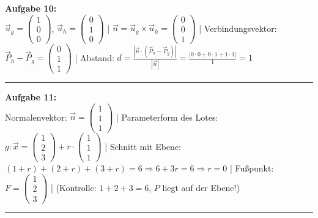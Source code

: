 \documentclass[12pt,a4paper]{article}
\newcommand{\vek}[1]{\vec{#1}}
\begin{document}
\textbf{Aufgabe 10:} \\
$\vek{u}_g = \begin{pmatrix}1\\0\\0\end{pmatrix}$, $\vek{u}_h = \begin{pmatrix}0\\1\\0\end{pmatrix}$ |
$\vek{n} = \vek{u}_g \times \vek{u}_h = \begin{pmatrix}0\\0\\1\end{pmatrix}$ |
Verbindungsvektor: $\vek{P}_h - \vek{P}_g = \begin{pmatrix}0\\1\\1\end{pmatrix}$ |
Abstand: $d = \frac{|\vek{n} \cdot (\vek{P}_h - \vek{P}_g)|}{|\vek{n}|} = \frac{|0\cdot0+0\cdot1+1\cdot1|}{1} = 1$
\begin{center}\rule{0.8\linewidth}{0.4pt}\end{center}

\textbf{Aufgabe 11:} \\
Normalenvektor: $\vek{n} = \begin{pmatrix}1\\1\\1\end{pmatrix}$ |
Parameterform des Lotes: $g: \vek{x} = \begin{pmatrix}1\\2\\3\end{pmatrix} + r \cdot \begin{pmatrix}1\\1\\1\end{pmatrix}$ |
Schnitt mit Ebene: $(1+r) + (2+r) + (3+r) = 6 \Rightarrow 6 + 3r = 6 \Rightarrow r = 0$ |
Fußpunkt: $F = \begin{pmatrix}1\\2\\3\end{pmatrix}$ |
(Kontrolle: $1+2+3=6$, $P$ liegt auf der Ebene!)
\begin{center}\rule{0.8\linewidth}{0.4pt}\end{center}
\end{document}
